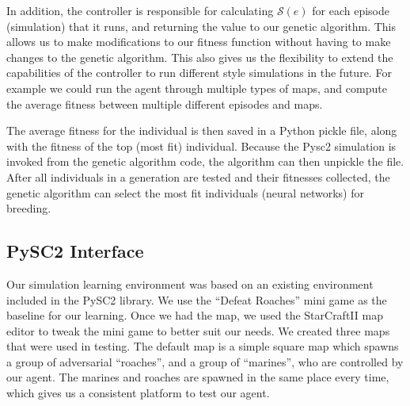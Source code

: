\documentclass{article}
\begin{document}

In addition, the controller is responsible for calculating $\mathcal{S}(e)$ for
each episode (simulation) that it runs, and returning the value to our genetic
algorithm. This allows us to make modifications to our fitness function without
having to make changes to the genetic algorithm. This also gives us the
flexibility to extend the capabilities of the controller to run different style
simulations in the future. For example we could run the agent through multiple
types of maps, and compute the average fitness between multiple different
episodes and maps.

The average fitness for the individual is then saved in a Python pickle file,
along with the fitness of the top (most fit) individual.  Because the Pysc2
simulation is invoked from the genetic algorithm code, the algorithm can then
unpickle the file.  After all individuals in a generation are tested and their
fitnesses collected, the genetic algorithm can select the most fit individuals
(neural networks) for breeding.

\subsection{PySC2 Interface}
Our simulation learning environment was based on an existing environment
included in the PySC2 library\cite{pysc2}. We use the ``Defeat Roaches'' mini
game as the baseline for our learning. Once we had the map, we used the
StarCraftII map editor to tweak the mini game to better suit our needs. We
created three maps that were used in testing. The default map is a simple square
map which spawns a group of adversarial ``roaches'', and a group of ``marines'',
who are controlled by our agent. The marines and roaches are spawned in the same
place every time, which gives us a consistent platform to test our agent.
\end{document}
